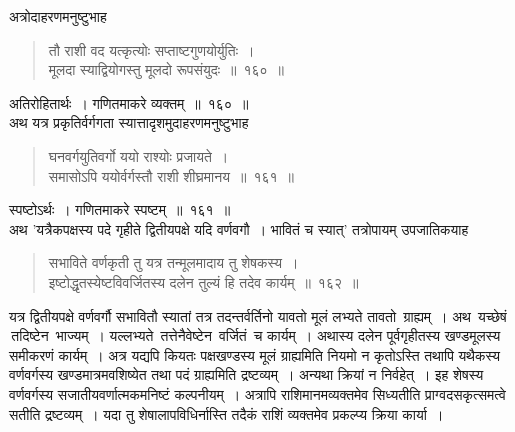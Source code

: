 \documentclass[11pt, openany]{book}
\begin{document}
\vspace{-2mm}
 अत्रोदाहरणमनुष्टुभाह\textendash
\begin{quote}
    \eg 
      तौ राशी वद यत्कृत्योः सप्ताष्टगुणयोर्युतिः~।\\
 मूलदा स्याद्वियोगस्तु मूलदो रूपसंयुदः~॥~१६०~॥~
\end{quote}

 अतिरोहितार्थः~। गणितमाकरे व्यक्तम्~॥~१६०~॥\\
 
 \vspace{-2mm}
 अथ यत्र प्रकृतिर्वर्गगता स्यात्तादृशमुदाहरणमनुष्टुभाह\textendash
 \begin{quote}
     \ab 
      घनवर्गयुतिवर्गो ययो राश्योः प्रजायते~।\\	
 समासोऽपि ययोर्वर्गस्तौ राशी शीघ्रमानय~॥~१६१~॥
 \end{quote}
 
 स्पष्टोऽर्थः~। गणितमाकरे स्पष्टम्~॥~१६१~॥\\
 
\vspace{-2mm}
 अथ {\qt 'यत्रैकपक्षस्य पदे गृहीते द्वितीयपक्षे यदि वर्णवगौ~। भावितं च स्यात्'} तत्रोपायम् उपजातिकयाह\textendash
\newpage

 \label{162}
\begin{quote}
    \ab 
    सभाविते वर्णकृती तु यत्र तन्मूलमादाय तु शेषकस्य~।\\
 इष्टोद्धृतस्येष्टविवर्जितस्य दलेन तुल्यं हि तदेव कार्यम्~॥~१६२~॥
\end{quote}

 यत्र द्वितीयपक्षे वर्णवर्गौ सभावितौ स्यातां तत्र तदन्तर्वर्तिनो यावतो
मूलं लभ्यते तावतो \,ग्राह्यम्~। अथ \,यच्छेषं \,तदिष्टेन \,भाज्यम्~। यल्लभ्यते \,तत्तेनैवेष्टेन \,वर्जितं \,च कार्यम्~। अथास्य दलेन पूर्वगृहीतस्य खण्डमूलस्य समीकरणं कार्यम्~। अत्र यद्यपि
कियतः पक्षखण्डस्य मूलं ग्राह्यमिति नियमो न कृतोऽस्ति तथापि यथैकस्य
वर्णवर्गस्य खण्डमात्रमवशिष्येत तथा पदं ग्राह्यमिति द्रष्टव्यम्~। अन्यथा क्रियां न
निर्वहेत्~। इह शेषस्य वर्णवर्गस्य सजातीयवर्णात्मकमनिष्टं कल्पनीयम्~। अत्रापि
राशिमानमव्यक्तमेव सिध्यतीति प्राग्वदसकृत्समत्वे सतीति द्रष्टव्यम्~। यदा तु
शेषालापविधिर्नास्ति तदैकं राशिं व्यक्तमेव प्रकल्प्य क्रिया कार्या~।\\
\vspace{-4mm}
\end{document}
